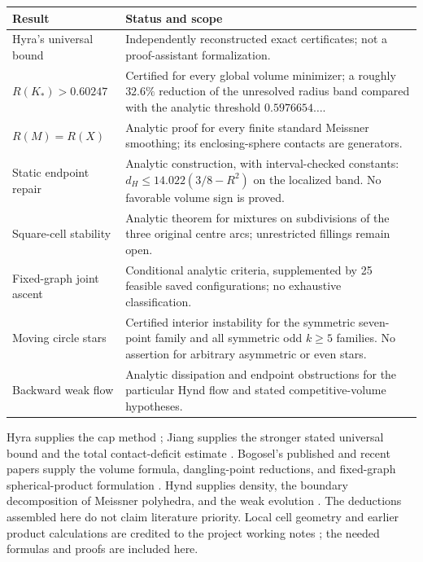 \documentclass[11pt]{article}
\theoremstyle{remark}\newtheorem{remark}[theorem]{Remark}
\begin{document}
\begin{center}\small
\begin{tabular}{p{.31\linewidth}p{.62\linewidth}}\toprule
Result & Status and scope\\\midrule
Hyra's universal bound & Independently reconstructed exact certificates; not a proof-assistant formalization.\\
$R(K_*)>0.60247$ & Certified for every global volume minimizer; a roughly $32.6\%$ reduction of the unresolved radius band compared with the analytic threshold $0.5976654\ldots$.\\
$R(M)=R(X)$ & Analytic proof for every finite standard Meissner smoothing; its enclosing-sphere contacts are generators.\\
Static endpoint repair & Analytic construction, with interval-checked constants: $d_H\leq14.022(3/8-R^2)$ on the localized band. No favorable volume sign is proved.\\
Square-cell stability & Analytic theorem for mixtures on subdivisions of the three original centre arcs; unrestricted fillings remain open.\\
Fixed-graph joint ascent & Conditional analytic criteria, supplemented by 25 feasible saved configurations; no exhaustive classification.\\
Moving circle stars & Certified interior instability for the symmetric seven-point family and all symmetric odd $k\geq5$ families. No assertion for arbitrary asymmetric or even stars.\\
Backward weak flow & Analytic dissipation and endpoint obstructions for the particular Hynd flow and stated competitive-volume hypotheses.\\\bottomrule
\end{tabular}
\end{center}

Hyra supplies the cap method \cite{Hyra}; Jiang supplies the stronger stated universal bound and the total contact-deficit estimate \cite{Jiang}. Bogosel's published and recent papers supply the volume formula, dangling-point reductions, and fixed-graph spherical-product formulation \cite{BogoselVolume,BogoselDangling,BogoselGraphs}. Hynd supplies density, the boundary decomposition of Meissner polyhedra, and the weak evolution \cite{HyndDensity,HyndFlow}. The deductions assembled here do not claim literature priority. Local cell geometry and earlier product calculations are credited to the project working notes \cite{Local}; the needed formulas and proofs are included here.
\end{document}
